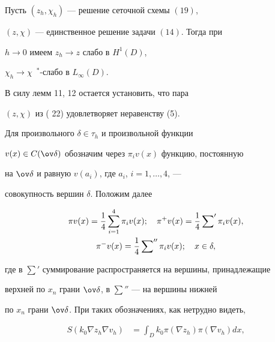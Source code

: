 \begin{thm}


Пусть $(z_h,\chi_h)$ --- решение сеточной схемы $(19)$,


$(z,\chi)$ --- единственное решение задачи $(14)$. Тогда при


$h\to 0$ имеем $z_h \to z$ слабо в $H^1(D)$,


$\chi_h \to \chi$\, $^*$-слабо в $L_{\infty}(D)$.


\end{thm}





\begin{pf}


В силу лемм 11, 12 остается установить, что пара


$(z,\chi)$ из ( 22) удовлетворяет неравенству (5).





Для произвольного $\delta \in \tau_h$ и произвольной функции


$v(x) \in C(\ov \delta)$ обозначим через $\pi_i v(x)$ функцию, постоянную


на $\ov \delta$ и равную $v(a_i)$, где ${a_i}$, $i=1,\dotsc,4$, ---


совокупность вершин $\delta$. Положим далее


\begin{gather*}


\pi v(x) = \frac14 \sum_{i=1}^{4} \pi_i v(x);\quad


\pi^+ v(x) = \frac14 \sideset{}{'}\sum \pi_i v(x),\\


%


\pi^- v(x) = \frac14 \sideset{}{''}\sum \pi_i v(x);\quad x \in \delta,


\end{gather*}


где в $\sum{}'$ суммирование распространяется на вершины, принадлежащие


верхней по $x_n$ грани $\ov \delta$, в $\sum{}''$ --- на вершины нижней


по $x_n$ грани $\ov \delta$. При таких обозначениях, как нетрудно видеть,


\begin{align*}


S(k_0 \nabla z_h \nabla v_h) &=


\int_{D} k_0 \pi (\nabla z_h)\pi(\nabla v_h) dx,\\



\end{align*}
\end{pf}

